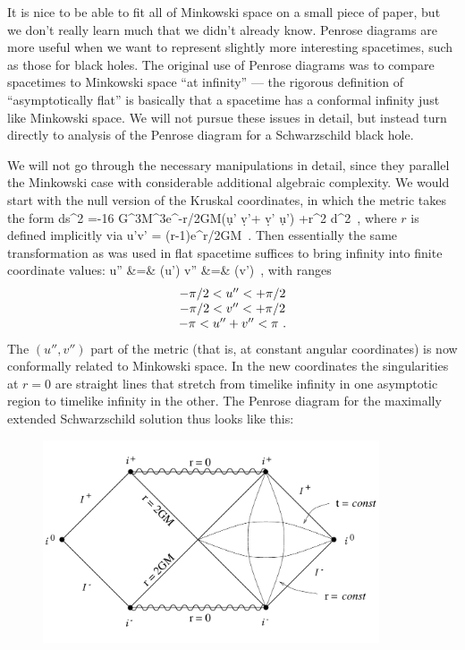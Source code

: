 \documentclass[12pt]{article}
\begin{document}
It is nice to be able to fit all of Minkowski space on a small piece
of paper, but we don't really learn much that we didn't already
know.  Penrose diagrams are more useful when we want to represent
slightly more interesting spacetimes, such as those for black holes.
The original use of Penrose diagrams was to compare spacetimes to
Minkowski space ``at infinity'' --- the rigorous definition of
``asymptotically flat'' is basically that a spacetime has a conformal
infinity just like Minkowski space.  We will not pursue these issues
in detail, but instead turn directly to analysis of the Penrose
diagram for a Schwarzschild black hole.

We will not go through the necessary manipulations
in detail, since they parallel the Minkowski case with
considerable additional algebraic complexity.  We would
start with the null version of the Kruskal coordinates, in
which the metric takes the form
\be
  ds^2 =-{{16 G^3M^3}}e^{-r/2GM}(\d u' \d v'+ \d v' \d u')
  +r^2 d\Omega^2\ ,  \label{7.103}
\ee
where $r$ is defined implicitly via
\be
  u'v' = \left({{r}}-1\right)e^{r/2GM}\ .
  \label{7.104}
\ee
Then essentially the same transformation as was used in
flat spacetime suffices to bring infinity into finite
coordinate values:
\bea
  u'' &=&  \arctan\left({{u'}}\right)\cr
  v'' &=&  \arctan\left({{v'}}\right)\ ,
  \label{7.105}
\eea
with ranges
\[\begin{array}{c}
  -\pi/2 < u'' < +\pi/2\cr -\pi/2 < v'' < +\pi/2\cr
  -\pi < u'' + v'' < \pi\ .
\end{array}\]
The $(u'',v'')$ part of the metric (that is, at constant angular
coordinates) is now conformally related to Minkowski space.
In the new coordinates the singularities
at $r=0$ are straight lines that stretch from timelike
infinity in one asymptotic region to timelike infinity in the 
other.  The Penrose diagram for the maximally extended 
Schwarzschild solution thus looks like this:

\begin{figure}[h]
  \centerline{
  \includegraphics[height=6cm]{pdf/seven24}}
\end{figure}
\end{document}
